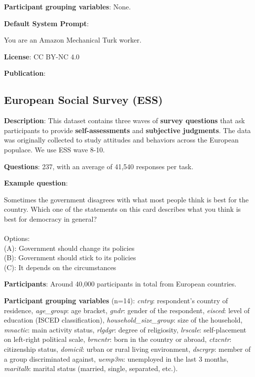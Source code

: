 \documentclass{article} %
\begin{document}
\textbf{Participant grouping variables}: None.

\textbf{Default System Prompt}:
\begin{examplebox}
You are an Amazon Mechanical Turk worker.\end{examplebox}


\textbf{License}: CC BY-NC 4.0

\textbf{Publication}: \cite{nie2020chaosnli}


\subsection{European Social Survey (ESS)}

\textbf{Description}: This dataset contains three waves of \textbf{survey questions} that ask participants to provide \textbf{self-assessments} and \textbf{subjective judgments}.
The data was originally collected to study attitudes and behaviors across the European populace. We use ESS wave 8-10.

\textbf{Questions}: 237, with an average of 41,540 responses per task.

\textbf{Example question}:

\begin{examplebox}
Sometimes the government disagrees with what most people think is best for the country. Which one of the statements on this card describes what you think is best for democracy in general?
\\\\
Options:\\
(A): Government should change its policies\\
(B): Government should stick to its policies\\
(C): It depends on the circumstances
\end{examplebox}

\textbf{Participants}: Around 40,000 participants in total from European countries.

\textbf{Participant grouping variables} (n=14):  
\textit{cntry}: respondent’s country of residence,  
\textit{age\_group}: age bracket,  
\textit{gndr}: gender of the respondent,  
\textit{eisced}: level of education (ISCED classification),  
\textit{household\_size\_group}: size of the household,  
\textit{mnactic}: main activity status,  
\textit{rlgdgr}: degree of religiosity,  
\textit{lrscale}: self-placement on left-right political scale,  
\textit{brncntr}: born in the country or abroad,  
\textit{ctzcntr}: citizenship status,  
\textit{domicil}: urban or rural living environment,  
\textit{dscrgrp}: member of a group discriminated against,  
\textit{uemp3m}: unemployed in the last 3 months,  
\textit{maritalb}: marital status (married, single, separated, etc.).
\end{document}
